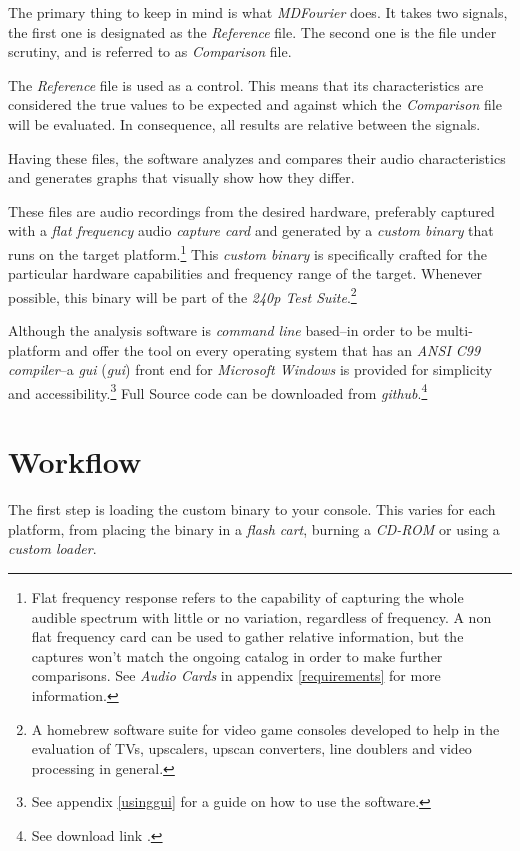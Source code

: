 \documentclass[10pt,a4paper]{report}
\newcommand{\define}[1]{\textit{\acrlong{#1}} (\textit{\acrshort{#1}})}
\begin{document}
The primary thing to keep in mind is what \textit{MDFourier} does. It takes two signals, the first one is designated as the \textit{Reference} file. The second one is the file under scrutiny, and is referred to as \textit{Comparison} file. 

The \textit{Reference} file is used as a control. This means that its characteristics are considered the true values to be expected and against which the \textit{Comparison} file will be evaluated. In consequence, all results are relative between the signals.

Having these files, the software analyzes and compares their audio characteristics and generates graphs that visually show how they differ.

These files are audio recordings from the desired hardware, preferably captured with a \textit{flat frequency} audio \textit{capture card} and generated by a \textit{custom binary} that runs on the target platform.\footnote{Flat frequency response refers to the capability of capturing the whole audible spectrum with little or no variation, regardless of frequency. A non flat frequency card can be used to gather relative information, but the captures won't match the ongoing catalog in order to make further comparisons. See \textit{Audio Cards} in appendix \ref{requirements} for more information.} This \textit{custom binary} is specifically crafted for the particular hardware capabilities and frequency range of the target. Whenever possible, this binary will be part of the \textit{240p Test Suite}.\footnote{A homebrew software suite for video game consoles developed to help in the evaluation of TVs, upscalers, upscan converters, line doublers and video processing in general.\cite{240pSuite}}


Although the analysis software is \textit{command line} based--in order to be multi-platform and offer the tool on every operating system that has an \textit{ANSI C99 compiler}--a \define{gui} front end for \textit{Microsoft Windows} is provided for simplicity and accessibility.\footnote{See appendix \ref{usinggui} for a guide on how to use the software.} Full Source code can be downloaded from \textit{github}.\footnote{See download link \cite{sourcecode}.}

\section{Workflow}
\label{workflow}

The first step is loading the custom binary to your console. This varies for each platform, from placing the binary in a \textit{flash cart}, burning a \textit{CD-ROM} or using a \textit{custom loader}.
\end{document}

